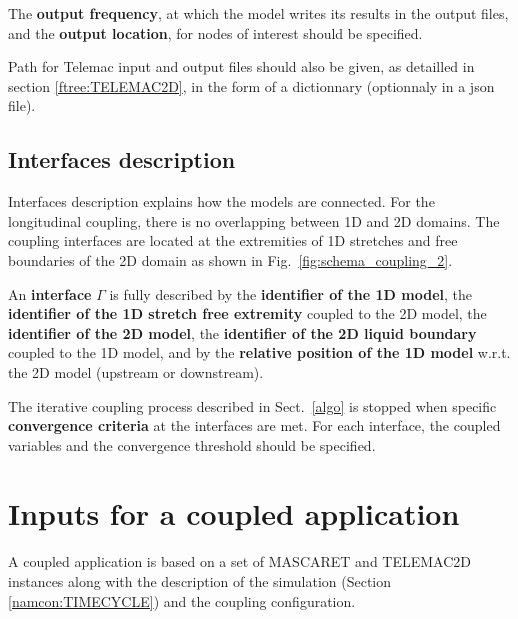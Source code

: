 \documentclass[Coupling]{../../data/TelemacDoc} %
\begin{document}
The {\bf output frequency}, at which the
model writes its results in the output files, and the {\bf output
  location}, for nodes of interest should be specified.
  
Path for Telemac input and output files should also be given,
as detailled in section \ref{ftree:TELEMAC2D}, in the form of a dictionnary (optionnaly in a json file).

\section{Interfaces description}\label{namcon:INTERF}
Interfaces description explains how the models are connected.  
For the longitudinal coupling, there is no overlapping between 1D and 2D domains. The coupling interfaces are located 
at the extremities of 1D stretches and free boundaries of the 2D
domain as shown in Fig.~\ref{fig:schema_coupling_2}.

An {\bf interface} $\Gamma$ is fully described by the {\bf
  identifier of the 1D model}, the {\bf identifier of the 1D stretch
free extremity} coupled to the 2D model, the {\bf
  identifier of the 2D model}, the {\bf identifier of the 2D liquid
boundary} coupled to the 1D model, and by the {\bf relative position
  of the 1D model} w.r.t. the 2D model (upstream or downstream).
\newline

The iterative coupling process described in Sect.~\ref{algo} is
stopped when specific {\bf convergence criteria} at the interfaces are
met. For each interface, the coupled variables and the convergence threshold should be specified. 

\chapter{Inputs for a coupled application}\label{ftree}
A coupled application is based on a set of MASCARET and
TELEMAC2D instances along with the description of the simulation (Section
\ref{namcon:TIMECYCLE}) and the coupling configuration. 
\newline
\end{document}
